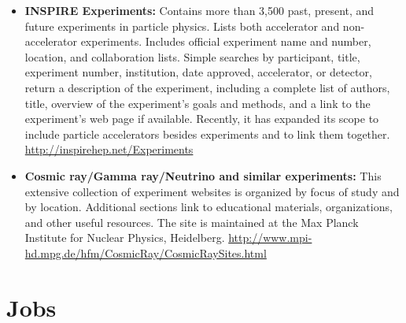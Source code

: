 \begin{itemize}
\item
  \textbf{INSPIRE Experiments:} Contains more than 3,500 past, present,
  and future experiments in particle physics. Lists both accelerator and
  non-accelerator experiments. Includes official experiment name and
  number, location, and collaboration lists. Simple searches by
  participant, title, experiment number, institution, date approved,
  accelerator, or detector, return a description of the experiment,
  including a complete list of authors, title, overview of the
  experiment's goals and methods, and a link to the experiment's web
  page if available. Recently, it has expanded its scope to include
  particle accelerators besides experiments and to link them together.
  \url{http://inspirehep.net/Experiments}
\item
  \textbf{Cosmic ray/Gamma ray/Neutrino and similar experiments:} This
  extensive collection of experiment websites is organized by focus of
  study and by location. Additional sections link to educational
  materials, organizations, and other useful resources. The site is
  maintained at the Max Planck Institute for Nuclear Physics,
  Heidelberg.
  \url{http://www.mpi-hd.mpg.de/hfm/CosmicRay/CosmicRaySites.html}
\end{itemize}

\section{Jobs}\label{databases:sec:jobs}

